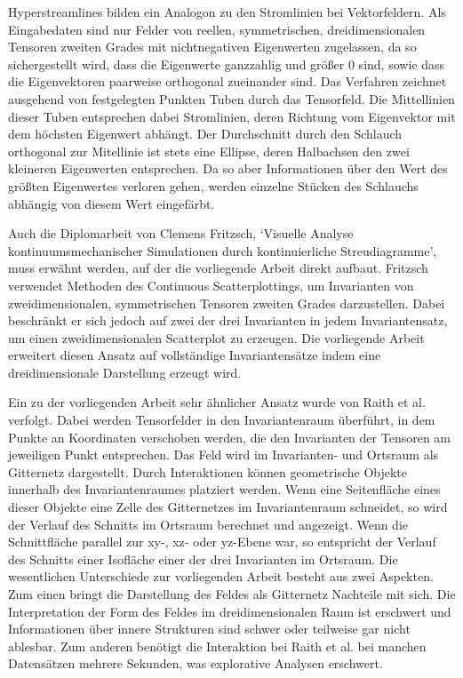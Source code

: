 \documentclass[a4paper,fontsize=12pt,toc=bib,halfparskip,ngerman]{scrartcl}
\begin{document}
Hyperstreamlines\cite{delmarcelle1993visualizing} bilden ein Analogon zu den Stromlinien bei Vektorfeldern. Als Eingabedaten sind nur Felder von reellen, symmetrischen, dreidimensionalen Tensoren zweiten Grades mit nichtnegativen Eigenwerten zugelassen, da so sichergestellt wird, dass die Eigenwerte ganzzahlig und gr\"o{\ss}er 0 sind, sowie dass die Eigenvektoren paarweise orthogonal zueinander sind. Das Verfahren zeichnet ausgehend von festgelegten Punkten Tuben durch das Tensorfeld. Die Mittellinien dieser Tuben entsprechen dabei Stromlinien, deren Richtung vom Eigenvektor mit dem h\"ochsten Eigenwert abh\"angt. Der Durchschnitt durch den Schlauch orthogonal zur Mitellinie ist stets eine Ellipse, deren Halbachsen den zwei kleineren Eigenwerten entsprechen. Da so aber Informationen \"uber den Wert des gr\"o{\ss}ten Eigenwertes verloren gehen, werden einzelne St\"ucken des Schlauchs abh\"angig von diesem Wert eingef\"arbt.

Auch die Diplomarbeit von Clemens Fritzsch, `Visuelle Analyse kontinuumsmechanischer Simulationen durch kontinuierliche Streudiagramme'\cite{fritzsch2016continuousScatterplot}, muss erw\"ahnt werden, auf der die vorliegende Arbeit direkt aufbaut. Fritzsch verwendet Methoden des Continuous Scatterplottings, um Invarianten von zweidimensionalen, symmetrischen Tensoren zweiten Grades darzustellen. Dabei beschr\"ankt er sich jedoch auf zwei der drei Invarianten in jedem Invariantensatz, um einen zweidimensionalen Scatterplot zu erzeugen. Die vorliegende Arbeit erweitert diesen Ansatz auf vollst\"andige Invariantens\"atze indem eine dreidimensionale Darstellung erzeugt wird.

Ein zu der vorliegenden Arbeit sehr \"ahnlicher Ansatz wurde von Raith et al. \cite{raith2019tensor} verfolgt. Dabei werden Tensorfelder in den Invariantenraum \"uberf\"uhrt, in dem Punkte an Koordinaten verschoben werden, die den Invarianten der Tensoren am jeweiligen Punkt entsprechen. Das Feld wird im Invarianten- und Ortsraum als Gitternetz dargestellt. Durch Interaktionen k\"onnen geometrische Objekte innerhalb des Invariantenraumes platziert werden. Wenn eine Seitenfl\"ache eines dieser Objekte eine Zelle des Gitternetzes im Invariantenraum schneidet, so wird der Verlauf des Schnitts im Ortsraum berechnet und angezeigt. Wenn die Schnittfl\"ache parallel zur xy-, xz- oder yz-Ebene war, so entspricht der Verlauf des Schnitts einer Isofl\"ache einer der drei Invarianten im Ortsraum. Die wesentlichen Unterschiede zur vorliegenden Arbeit besteht aus zwei Aspekten. Zum einen bringt die Darstellung des Feldes als Gitternetz Nachteile mit sich. Die Interpretation der Form des Feldes im dreidimensionalen Raum ist erschwert und Informationen \"uber innere Strukturen sind schwer oder teilweise gar nicht ablesbar. Zum anderen ben\"otigt die Interaktion bei Raith et al. bei manchen Datens\"atzen mehrere Sekunden, was explorative Analysen erschwert.
\end{document}

